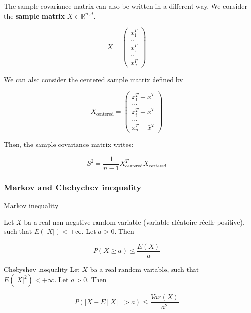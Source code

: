 \documentclass[
10pt, %
a4paper, %
oneside, %
headinclude,footinclude, %
BCOR5mm, %
]{scrartcl}
\begin{document}
\begin{remark}
    The sample covariance matrix can also be written in a different way. We consider the \textbf{{sample matrix}} $X\in \mathbb{R}^{n,d}$.

    \begin{equation*}
    X=\begin{pmatrix}
	x_1^T\\
...\\
	x_i^T\\
...\\
	x_n^T
\end{pmatrix}
    \end{equation*}

    We can also consider the centered sample matrix defined by

    \begin{equation*}
	X_{\text{centered}}=\begin{pmatrix}
	x_1^T- \bar{x}^T\\
...\\
	x_i^T- \bar{x}^T\\
...\\
	x_n^T- \bar{x}^T
\end{pmatrix}
    \end{equation*}

    Then, the sample covariance matrix writes:

    \begin{equation*}
	S^2 = \frac{1}{n-1} X_{\text{centered}}^TX_{\text{centered}}
    \end{equation*}
\end{remark}

\subsubsection{\large\color{Periwinkle}Markov and Chebychev inequality}

\begin{proposition}{Markov inequality}

    Let $X$ ba a real non-negative random variable (variable aléatoire réelle positive), such that $E(|X|)<+\infty$. Let $a>0$. Then

    \begin{equation*}
	P(X\geq a)\leq \frac{E(X)}{a} 
    \end{equation*}
    
\end{proposition}

\begin{proposition}{Chebyshev inequality}
    Let $X$ ba a real random variable, such that $E(|X|^2)<+\infty$. Let $a>0$. Then

    \begin{equation*}
	P(|X-E[X]|>a)\leq \frac{Var(X)}{a^2} 
    \end{equation*}
\end{proposition}
\end{document}

